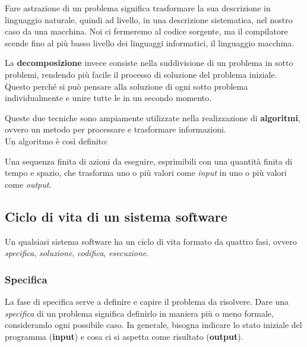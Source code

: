 \documentclass{article}
\begin{document}
Fare astrazione di un problema significa trasformare la sua descrizione in linguaggio naturale, quindi ad  livello, in una descrizione sistematica, nel nostro caso  da una macchina. Noi ci fermeremo al codice sorgente, ma il compilatore scende fino al più basso livello dei linguaggi informatici, il linguaggio macchina.

La \textbf{decomposizione} invece consiste nella suddivisione di un problema in sotto problemi, rendendo più facile il processo di soluzione del problema iniziale. Questo perché si può pensare alla soluzione di ogni sotto problema individualmente e unire tutte le  in un secondo momento.

Queste due tecniche sono ampiamente utilizzate nella realizzazione di \textbf{algoritmi}, ovvero un metodo per processare e trasformare informazioni.\\
Un algoritmo è così definito:
\begin{dfn}
    Una sequenza finita di azioni da eseguire, esprimibili con una quantità finita di tempo e spazio, che trasforma uno o più valori come \emph{input} in uno o più valori come \emph{output}.
\end{dfn}

\subsection{Ciclo di vita di un sistema software}
Un qualsiasi sistema software ha un ciclo di vita formato da quattro fasi, ovvero \emph{specifica}, \emph{soluzione}, \emph{codifica}, \emph{esecuzione}.

\subsubsection{Specifica}
La fase di specifica serve a definire e capire il problema da risolvere.
Dare una \emph{specifica} di un problema significa definirlo in maniera più o meno formale, considerando ogni possibile caso.
In generale, bisogna indicare lo stato iniziale del programma (\textbf{input}) e cosa ci si aspetta come risultato (\textbf{output}).
\end{document}
